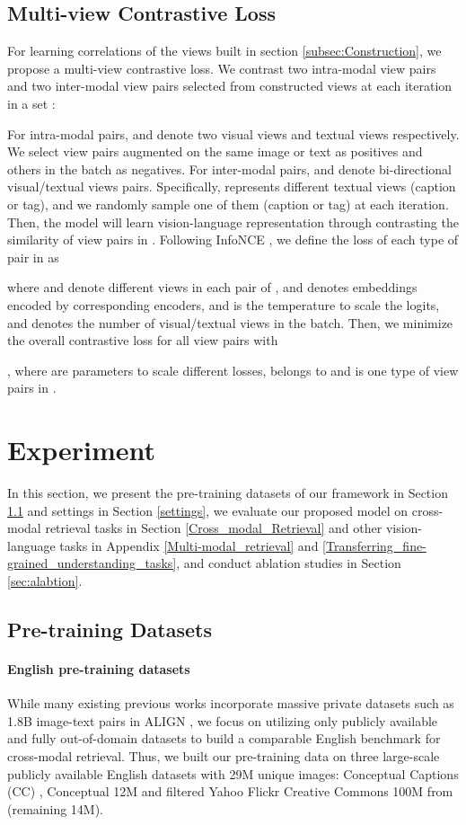 \documentclass{article}
\begin{document}
\subsection{Multi-view Contrastive Loss}
\label{subsec:Objectives}
For learning correlations of the views built in section \ref{subsec:Construction}, we propose a multi-view contrastive loss. We contrast two intra-modal view pairs and two inter-modal view pairs selected from constructed views at each iteration in a set :  

For intra-modal pairs,  and  denote two visual views and textual views respectively. We select view pairs augmented on the same image or text as positives and others in the batch as negatives. For inter-modal pairs,  and  denote bi-directional visual/textual views pairs. Specifically,  represents different textual views (caption or tag), and we randomly sample one of them (caption or tag) at each iteration. Then, the model will learn vision-language representation through contrasting the similarity of view pairs in . Following InfoNCE \cite{Oord2018RepresentationLW}, we define the loss of each type of pair in  as

where  and  denote different views in each pair of , and  denotes embeddings encoded by corresponding encoders, and  is the temperature to scale the logits, and  denotes the number of visual/textual views in the batch. Then, we minimize the overall contrastive loss for all view pairs with 


, where  are parameters to scale different losses,  belongs to  and is one type of view pairs in .

\section{Experiment}
\label{sec:Experiment}
In this section, we present the pre-training datasets of our framework in Section \ref{sec:Pretraining Datasets} and settings in Section \ref{settings}, we evaluate our proposed model on cross-modal retrieval tasks in Section \ref{Cross_modal_Retrieval} and other vision-language tasks in Appendix \ref{Multi-modal_retrieval} and \ref{Transferring_fine-grained_understanding_tasks}, and conduct ablation studies in Section \ref{sec:alabtion}.
\subsection{Pre-training Datasets} 
\label{sec:Pretraining Datasets}
\paragraph{English pre-training datasets}  While many existing previous works incorporate massive private datasets such as 1.8B image-text pairs in ALIGN \cite{Jia2021ScalingUV}, we focus on utilizing only publicly available and fully out-of-domain datasets to build a comparable English benchmark for cross-modal retrieval. Thus, we built our pre-training data on three large-scale publicly available English datasets with 29M unique images: Conceptual Captions (CC) \cite{ng2020understanding}, Conceptual 12M \cite{changpinyo2021cc12m} and filtered Yahoo Flickr Creative Commons 100M \cite{Thomee2016YFCC100MTN} from \cite{Radford2021LearningTV} (remaining 14M). 
\end{document}
